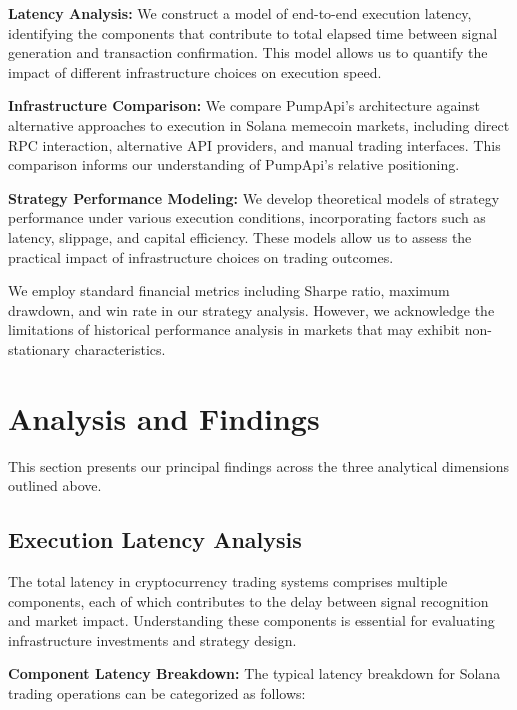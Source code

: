 \documentclass[12pt,a4paper]{article}
\begin{document}
\textbf{Latency Analysis:} We construct a model of end-to-end execution latency, identifying the components that contribute to total elapsed time between signal generation and transaction confirmation. This model allows us to quantify the impact of different infrastructure choices on execution speed.

\textbf{Infrastructure Comparison:} We compare PumpApi's architecture against alternative approaches to execution in Solana memecoin markets, including direct RPC interaction, alternative API providers, and manual trading interfaces. This comparison informs our understanding of PumpApi's relative positioning.

\textbf{Strategy Performance Modeling:} We develop theoretical models of strategy performance under various execution conditions, incorporating factors such as latency, slippage, and capital efficiency. These models allow us to assess the practical impact of infrastructure choices on trading outcomes.

We employ standard financial metrics including Sharpe ratio, maximum drawdown, and win rate in our strategy analysis. However, we acknowledge the limitations of historical performance analysis in markets that may exhibit non-stationary characteristics.

\section{Analysis and Findings}

This section presents our principal findings across the three analytical dimensions outlined above.

\subsection{Execution Latency Analysis}

The total latency in cryptocurrency trading systems comprises multiple components, each of which contributes to the delay between signal recognition and market impact. Understanding these components is essential for evaluating infrastructure investments and strategy design.

\textbf{Component Latency Breakdown:} The typical latency breakdown for Solana trading operations can be categorized as follows:
\end{document}
